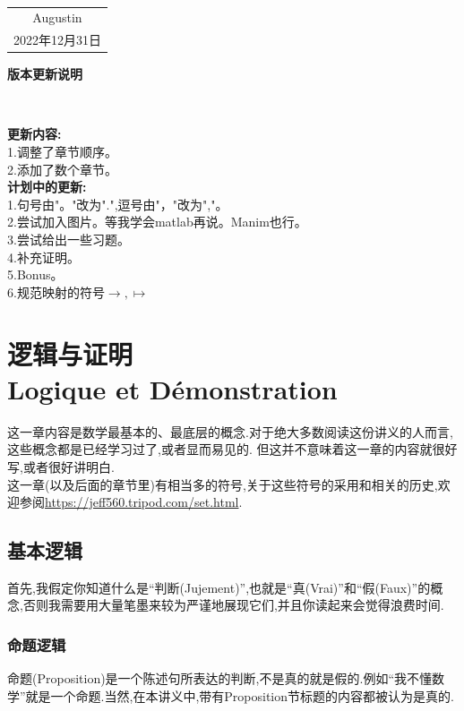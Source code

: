 \documentclass[12pt, a4paper, oneside]{ctexbook}
\begin{document}
~\\
\begin{flushright}
    \begin{tabular}{c}
        Augustin\\
        2022年12月31日
    \end{tabular}
\end{flushright}


\newpage
\begin{center}
  \Huge\textbf{版本更新说明}
\end{center}~\


\noindent
\textbf{更新内容:}\\
1.调整了章节顺序。\\
2.添加了数个章节。\\

\noindent
\textbf{计划中的更新:}\\
1.句号由"。"改为".",逗号由"，"改为","。\\
2.尝试加入图片。等我学会matlab再说。Manim也行。\\
3.尝试给出一些习题。\\
4.补充证明。\\
5.Bonus。\\
6.规范映射的符号$\rightarrow,\mapsto $



\newpage
{}
\setcounter{page}{1}
\tableofcontents
\newpage
\setcounter{page}{1}


\chapter{逻辑与证明\\ Logique et Démonstration}
  这一章内容是数学最基本的、最底层的概念.对于绝大多数阅读这份讲义的人而言,这些概念都是已经学习过了,或者显而易见的.
  但这并不意味着这一章的内容就很好写,或者很好讲明白.\\

  这一章(以及后面的章节里)有相当多的符号,关于这些符号的采用和相关的历史,欢迎参阅\url{https://jeff560.tripod.com/set.html}.
  \section{基本逻辑}
  首先,我假定你知道什么是“判断(Jujement)”,也就是“真(Vrai)”和“假(Faux)”的概念,否则我需要用大量笔墨来较为严谨地展现它们,并且你读起来会觉得浪费时间.
  \subsection{命题逻辑}
  命题(Proposition)是一个陈述句所表达的判断,不是真的就是假的.例如“我不懂数学”就是一个命题.当然,在本讲义中,带有Proposition节标题的内容都被认为是真的.
\end{document}
